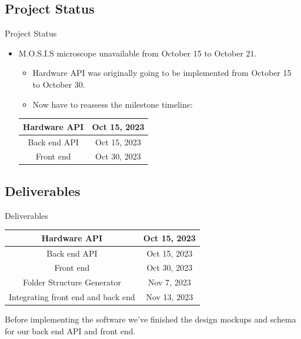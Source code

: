 \documentclass[17pt, aspectratio=169]{beamer}
\begin{document}
\subsection{Project Status}
\begin{frame}{Project Status}
	\begin{itemize}
		\item M.O.S.I.S microscope unavailable from October 15 to October 21.
		      \begin{itemize}
			      \item Hardware API was originally going to be implemented from October 15 to October 30.
			      \item Now have to reassess the milestone timeline:
		      \end{itemize}
		      \begin{center}
			      \begin{tabular}{||c | c||}
				      \hline
				      Hardware API & Oct 15, 2023 \\
				      \hline
				      Back end API & Oct 15, 2023 \\
				      \hline
				      Front end    & Oct 30, 2023 \\
				      \hline
			      \end{tabular}
		      \end{center}
	\end{itemize}
\end{frame}
\subsection*{Deliverables}
\begin{frame}{Deliverables}
	\begin{center}
		\begin{tabular}{||c | c||}
			\hline
			Hardware API & Oct 15, 2023 \\
			\hline
			Back end API & Oct 15, 2023 \\
			\hline
			Front end    & Oct 30, 2023 \\
			\hline
			Folder Structure Generator & Nov 7, 2023\\
			\hline
			Integrating front end and back end & Nov 13, 2023 \\
			\hline
		\end{tabular}
	\end{center}
	Before implementing the software we've finished the design mockups and schema for our back end API and front end.
\end{frame}
\end{document}

